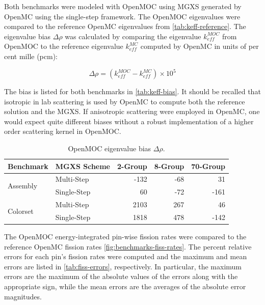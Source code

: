 Both benchmarks were modeled with OpenMOC using MGXS generated by OpenMC using the single-step framework. The OpenMOC eigenvalues were compared to the reference OpenMC eigenvalues from \autoref{tab:keff-reference}. The eigenvalue bias $\Delta\rho$ was calculated by comparing the eigenvalue $k_{eff}^{MOC}$ from OpenMOC to the reference eigenvalue $k_{eff}^{MC}$ computed by OpenMC in units of per cent mille (pcm):

\begin{equation}
\label{eqn:delta-rho}
\Delta\rho = \left(k_{eff}^{MOC} - k_{eff}^{MC}\right) \times 10^{5}
\end{equation}

The bias is listed for both benchmarks in \autoref{tab:keff-bias}. It should be recalled that isotropic in lab scattering is used by OpenMC to compute both the reference solution and the MGXS. If anisotropic scattering were employed in OpenMC, one would expect quite different biases without a robust implementation of a higher order scattering kernel in OpenMOC.

\begin{table}[h!]
  \centering
  \caption{OpenMOC eigenvalue bias $\Delta\rho$.}
  \label{tab:keff-bias} 
  \begin{tabular}{l l r r r}
  \toprule
  \textbf{Benchmark} & \textbf{MGXS Scheme} & \textbf{2-Group} & \textbf{8-Group} & \textbf{70-Group} \\
  \midrule
  \multirow{2}{*}{Assembly} & Multi-Step    & -132 & -68 &   31 \\
                            & Single-Step &   60 & -72 & -161 \\
  \midrule
  \multirow{2}{*}{Colorset} & Multi-Step    & 2103 & 267 &   46 \\
                            & Single-Step & 1818 & 478 & -142 \\
  \bottomrule
\end{tabular}
\end{table}

The OpenMOC energy-integrated pin-wise fission rates were compared to the reference OpenMC fission rates \autoref{fig:benchmarks-fiss-rates}. The percent relative errors for each pin's fission rates were computed and the maximum and mean errors are listed in \autoref{tab:fiss-errors}, respectively. In particular, the maximum errors are the maximum of the absolute values of the errors along with the appropriate sign, while the mean errors are the averages of the absolute error magnitudes.

